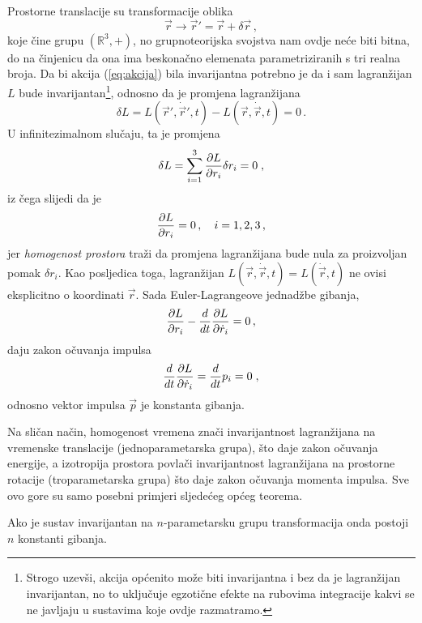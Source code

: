 Prostorne translacije su transformacije oblika
\begin{equation}
\vec{r}\to\vec{r}'=\vec{r}+\delta\vec{r} \,,
\end{equation}
koje čine grupu $(\mathbb{R}^{3},+)$, no grupnoteorijska svojstva nam ovdje
neće biti bitna, do na činjenicu da ona ima beskonačno elemenata parametriziranih
s tri realna broja. Da bi akcija (\ref{eq:akcija}) bila invarijantna potrebno
je da i sam lagranžijan $L$  bude invarijantan\footnote{Strogo uzevši, akcija
    općenito može biti invarijantna i bez da je lagranžijan invarijantan, no to uključuje
    egzotične efekte na rubovima integracije kakvi se ne javljaju u sustavima
    koje ovdje razmatramo.}, odnosno da je promjena lagranžijana
\begin{equation}
 \delta L = L(\vec{r}', \dot{\vec{r}}', t) -  L(\vec{r}, \dot{\vec{r}}, t)
 =0 \,.
\end{equation}
U infinitezimalnom slučaju, ta je promjena
\begin{equation}
    \delta L =  \sum_{i=1}^{3} \frac{\partial L}{\partial r_i} \delta r_i =0 \;,
\end{equation}
iz čega slijedi da je
\begin{equation}
 \frac{\partial L}{\partial r_i}=0 \,, \quad i=1,2,3 \,,
\end{equation}
jer \emph{homogenost prostora} traži da promjena lagranžijana bude nula
za proizvoljan pomak $\delta r_i$.  Kao posljedica toga, lagranžijan
$L(\vec{r},\dot{\vec{r}},t)=L(\dot{\vec{r}},t)$ ne ovisi eksplicitno
o koordinati $\vec{r}$.
Sada Euler-Lagrangeove jednadžbe gibanja,
\begin{equation}
  \frac{\partial L}{\partial r_i}-\frac{d}{d t} \frac{\partial L}{\partial \dot{r}_i}=0 \,,
\end{equation}
daju zakon očuvanja impulsa
\begin{equation}
\frac{d}{d t} \frac{\partial L}{\partial \dot{r}_i}=
\frac{d}{d t} p_i =0  \;,
\end{equation}
odnosno vektor impulsa $\vec{p}$ je konstanta gibanja.

Na sličan način, homogenost vremena znači invarijantnost lagranžijana
na vremenske translacije (jednoparametarska grupa),
što daje zakon očuvanja energije, a izotropija prostora povlači
invarijantnost lagranžijana na prostorne rotacije (troparametarska
grupa) što daje zakon očuvanja momenta impulsa.
Sve ovo gore su samo posebni primjeri sljedećeg općeg teorema.

\begin{teorem}[Noether]
Ako je sustav invarijantan na $n$-parametarsku
grupu transformacija onda postoji $n$ konstanti gibanja.
\end{teorem}

